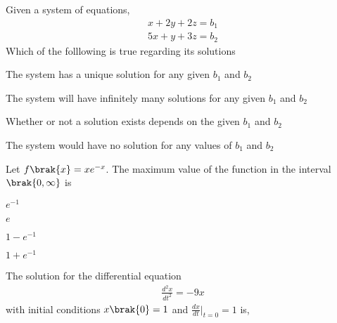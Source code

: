     \item Given a system of equations,
        \begin{align*}
            x+2y+2z=b_1\\
            5x+y+3z=b_2
        \end{align*}
        Which of the folllowing is true regarding its solutions
        \begin{enumerate}
                \begin{multicols}{2}
                \item The system has a unique solution for any given $b_1$ and $b_2$
                    \columnbreak
                \item The system will have infinitely many solutions for any given $b_1$ and $b_2$
                \end{multicols}
                \begin{multicols}{2}
                \item Whether or not a solution exists depends on the given $b_1$ and $b_2$
                    \columnbreak
                \item The system would have no solution for any values of $b_1$ and $b_2$
                \end{multicols}
        \end{enumerate}
    \item Let $f\brak{x}=xe^{-x}$. The maximum value of the function in the interval $\brak{0,\infty}$ is
        \begin{enumerate}
                \begin{multicols}{2}
                \item $e^{-1}$
                    \columnbreak
                \item $e$
                \end{multicols}
                \begin{multicols}{2}
                \item $1-e^{-1}$ 
                    \columnbreak
                \item $1+e^{-1}$
                \end{multicols}
        \end{enumerate}
    \item The solution for the differential equation
        \begin{align*}
            \frac{d^2x}{dt^2}=-9x
        \end{align*}
        with initial conditions $x\brak{0}=1$ and $\frac{dx}{dt}|_{t=0} =1$ is,
